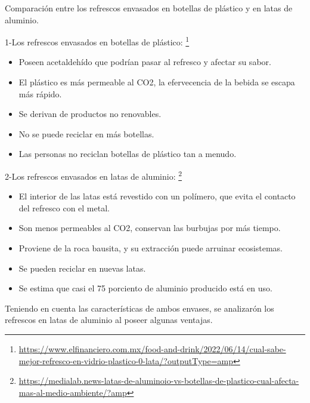 \documentclass{beamer}
\begin{document}
\begin{frame}{Comparación entre los refrescos envasados en botellas de plástico y en latas de aluminio.}
   \scriptsize 

    1-Los refrescos envasados en botellas de plástico:
    \footnote{\href{https://www.elfinanciero.com.mx/food-and-drink/2022/06/14/cual-sabe-mejor-refresco-en-vidrio-plastico-0-lata/?outputType=amp}{https://www.elfinanciero.com.mx/food-and-drink/2022/06/14/cual-sabe-mejor-refresco-en-vidrio-plastico-0-lata/?outputType=amp}}
    \begin{itemize}
    
  \item Poseen acetaldehído que podrían pasar al refresco y afectar su sabor.
  \item El plástico es más permeable al CO2, la efervecencia de la bebida se escapa más rápido.
  \item Se derivan de productos no renovables.
  \item No se puede reciclar en más botellas.
  \item Las personas no reciclan botellas de plástico tan a menudo.
  \end{itemize}
  2-Los refrescos envasados en latas de aluminio:
  \footnote{\href{https://medialab.news-latas-de-aluminoio-vs-botellas-de-plastico-cual-afecta-mas-al-medio-ambiente/?amp}{https://medialab.news-latas-de-aluminoio-vs-botellas-de-plastico-cual-afecta-mas-al-medio-ambiente/?amp}}
  \begin{itemize}
  \item El interior de las latas está revestido con un polímero, que evita el contacto del refresco con el metal.
  \item Son menos permeables al CO2, conservan las burbujas por más tiempo.
  \item Proviene de la roca bausita, y su extracción puede arruinar ecosistemas.
  \item Se pueden reciclar en nuevas latas.
  \item Se estima que casi el 75 porciento de aluminio producido está en uso.
  \end{itemize}
  
Teniendo en cuenta las características de ambos envases, se analizarón los refrescos en latas de aluminio al poseer algunas ventajas.

  
\end{frame}
\end{document}
